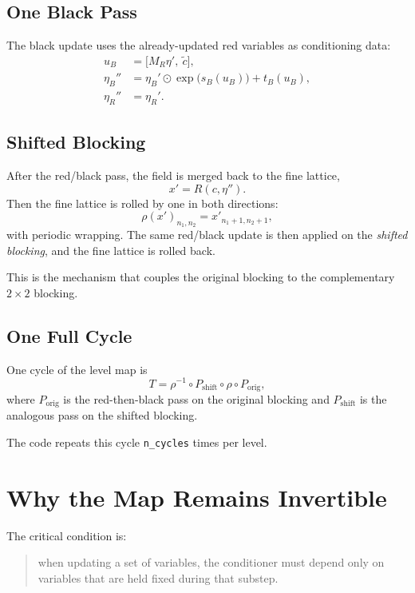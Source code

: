 \documentclass[11pt]{article}
\begin{document}
\subsection{One Black Pass}

The black update uses the already-updated red variables as conditioning data:
\begin{align}
u_B &= \bigl[M_R\eta',\ \tilde c\bigr], \\
\eta_B'' &= \eta_B' \odot \exp\bigl(s_B(u_B)\bigr) + t_B(u_B), \\
\eta_R'' &= \eta_R'.
\end{align}

\subsection{Shifted Blocking}

After the red/black pass, the field is merged back to the fine lattice,
\[
x' = R(c,\eta'').
\]
Then the fine lattice is rolled by one in both directions:
\[
\rho(x')_{n_1,n_2} = x'_{n_1+1,n_2+1},
\]
with periodic wrapping. The same red/black update is then applied on the
\emph{shifted blocking}, and the fine lattice is rolled back.

This is the mechanism that couples the original blocking to the complementary
$2\times 2$ blocking.

\subsection{One Full Cycle}

One cycle of the level map is
\begin{equation}
T = \rho^{-1}\circ P_{\mathrm{shift}}\circ \rho \circ P_{\mathrm{orig}},
\end{equation}
where $P_{\mathrm{orig}}$ is the red-then-black pass on the original blocking
and $P_{\mathrm{shift}}$ is the analogous pass on the shifted blocking.

The code repeats this cycle \texttt{n\_cycles} times per level.

\section{Why the Map Remains Invertible}

The critical condition is:
\begin{quote}
when updating a set of variables, the conditioner must depend only on variables
that are held fixed during that substep.
\end{quote}
\end{document}
